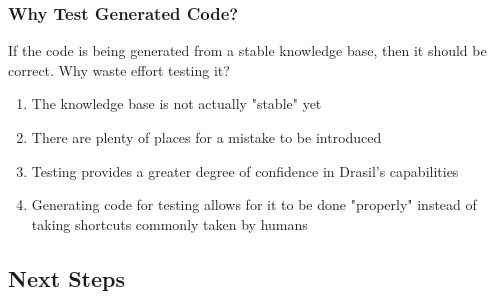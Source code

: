 \documentclass{beamer}
\begin{document}
\begin{frame}
    \frametitle{Why Test Generated Code?}
    If the code is being generated from a stable knowledge base,
    then it should be correct. Why waste effort testing it?
    \begin{enumerate}
        \item<2-> The knowledge base is not actually "stable" yet
        \item<3-> There are plenty of places for a mistake to be introduced
        \item<4-> Testing provides a greater degree of confidence in
              Drasil's capabilities
        \item<5-> Generating code for testing allows for it to be done
              "properly" instead of taking shortcuts commonly taken by humans
    \end{enumerate}
\end{frame}

\subsection{Next Steps}
\end{document}
